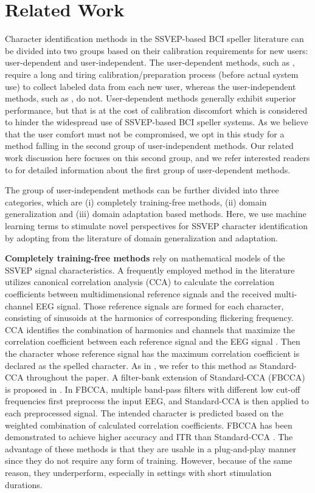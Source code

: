 \documentclass[12pt]{iopart}
\begin{document}
\section{Related Work} \label{sec:related_work}
Character identification methods in the SSVEP-based BCI speller literature can be divided into two groups based on their calibration requirements for new users: user-dependent and user-independent.  The user-dependent methods, such as {\cite{ournetwork,convca,trca,r3_p3}}, require a long and tiring calibration/preparation process (before actual system use) to collect labeled data from each new user, whereas the user-independent methods, such as \cite{CCA_method,fbcca}, do not. User-dependent methods generally exhibit superior performance, but that is at the cost of calibration discomfort \cite{to_train} which {is considered to hinder } the widespread use of SSVEP-based BCI speller systems. As we believe that the user comfort must not be compromised, we opt in this study for a method falling in the second group of user-independent methods. Our related work discussion here focuses on this second group, and we refer interested readers to \cite{to_train,ournetwork} for detailed information about the first group of user-dependent methods.

The group of user-independent methods can be further divided into three categories, which are (i) completely training-free methods, (ii) domain generalization and (iii) domain adaptation based methods. Here, we use machine learning terms to stimulate novel perspectives for SSVEP character identification by adopting from the literature of domain generalization and adaptation. 

{\bf Completely training-free methods} rely on mathematical models of the SSVEP signal characteristics.  A frequently employed method in the literature \cite{CCA_method} utilizes canonical correlation analysis (CCA) \cite{cca_statistic} to calculate the correlation coefficients between multidimensional reference signals and the received multi-channel EEG signal. Those reference signals are formed for each character, consisting of sinusoids at the harmonics of corresponding flickering frequency. CCA identifies the combination of harmonics and channels that maximize the correlation coefficient between each reference signal and the EEG signal \cite{CCA_method}. Then the character whose reference signal has the maximum correlation coefficient is declared as the spelled character. As in \cite{ournetwork}, we refer to this method as Standard-CCA throughout the paper. A filter-bank extension of Standard-CCA (FBCCA) is proposed in \cite{fbcca}. In FBCCA, multiple band-pass filters with different low cut-off frequencies first preprocess the input EEG, and Standard-CCA is then applied to each preprocessed signal. The intended character is predicted based on the weighted combination of calculated correlation coefficients. FBCCA has been demonstrated to achieve higher accuracy and ITR than Standard-CCA \cite{fbcca}. The advantage of these methods is that they are usable in a plug-and-play manner since they do not require any form of training. However, because of the same reason, they underperform, especially in settings with short stimulation durations.
\end{document}
